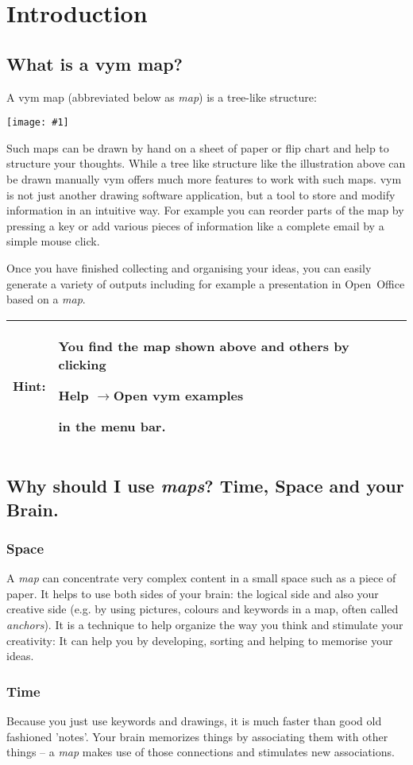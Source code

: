\documentclass[12pt,a4paper]{article}
\newlength{\maximgwidth}
\newcommand{\maximage}[1]{  
    \begin{center}
        \texttt{[image: \#1]} 
    \end{center}
}
\newcommand{\hint}[1]{
    \begin{center} 
        \begin{tabular}{|rp{12cm}|} \hline
            {\bf Hint}:& #1\\   \hline
        \end{tabular}
            \marginpar{\Huge !} 
    \end{center} 
}
\newcommand{\vym}{{\sc vym }}
\newcommand{\ra}{$\longrightarrow$}
\begin{document}
\section{Introduction}
\subsection{What is a \vym map?}
A \vym map (abbreviated below as {\em map}) is a tree-like structure:
\maximage{images/example1.png}
Such maps can be drawn by hand on a sheet of paper or flip chart and
help to structure your thoughts. While a tree like structure like the
illustration above can be drawn manually \vym offers much more features
to work with such maps.  \vym is not just another drawing software
application, but a tool to store and modify information in an intuitive
way. For example you can reorder parts of the map by pressing a key or
add various pieces of information like a complete email by a simple
mouse click.

Once you have finished collecting and organising your ideas, you can
easily generate a variety of outputs including for example a
presentation in Open~Office based on a {\em map}.

\hint{You find the map shown above and others by clicking
\begin{center}Help \ra Open vym examples\end{center} in the menu bar.}

\subsection{Why should I use {\em maps}? Time, Space and your Brain.}
\subsubsection*{Space}
A {\em map} can concentrate very complex content in a small space such
as a piece of paper. It helps to use both sides of your brain: the
logical side and also your creative side (e.g. by using pictures,
colours and keywords in a map, often called {\em anchors}).  It is a
technique to help organize the way you think and stimulate your
creativity: It can help you by developing, sorting and helping to
memorise your ideas. 

\subsubsection*{Time}
Because you just use keywords and drawings, it is much faster than good
old fashioned 'notes'. Your brain memorizes things by associating them
with other things -- a {\em map} makes use of those connections and
stimulates new associations. 
\end{document}
